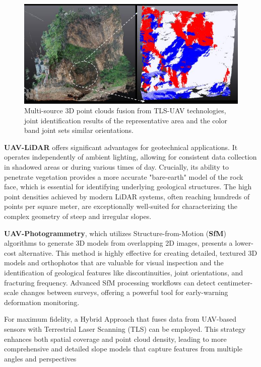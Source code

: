 \documentclass{article}
\begin{document}
\begin{figure}[h!]
	\centering
	\includegraphics[width=0.7\linewidth]{figures/uav-tls.png}
	\caption{Multi-source 3D point clouds fusion from TLS-UAV technologies,  joint identification results of the representative area and the color band joint sets similar orientations. \cite{3dCloudFusion}}
	\label{fig:fig1}
\end{figure}


\textbf{UAV-LiDAR} offers significant advantages for geotechnical applications. It operates independently of ambient lighting, allowing for consistent data collection in shadowed areas or during various times of day. Crucially, its ability to penetrate vegetation provides a more accurate "bare-earth" model of the rock face, which is essential for identifying underlying geological structures. The high point densities achieved by modern LiDAR systems, often reaching hundreds of points per square meter, are exceptionally well-suited for characterizing the complex geometry of steep and irregular slopes. \cite{land14061193}

\textbf{UAV-Photogrammetry}, which utilizes Structure-from-Motion (\textbf{SfM}) algorithms to generate 3D models from overlapping 2D images, presents a lower-cost alternative. This method is highly effective for creating detailed, textured 3D models and orthophotos that are valuable for visual inspection and the identification of geological features like discontinuities, joint orientations, and fracturing frequency. Advanced SfM processing workflows can detect centimeter-scale changes between surveys, offering a powerful tool for early-warning deformation monitoring.   

For maximum fidelity, a Hybrid Approach that fuses data from UAV-based sensors with Terrestrial Laser Scanning (TLS) can be employed. This strategy enhances both spatial coverage and point cloud density, leading to more comprehensive and detailed slope models that capture features from multiple angles and perspectives \citet{3dCloudFusion}
\end{document}
